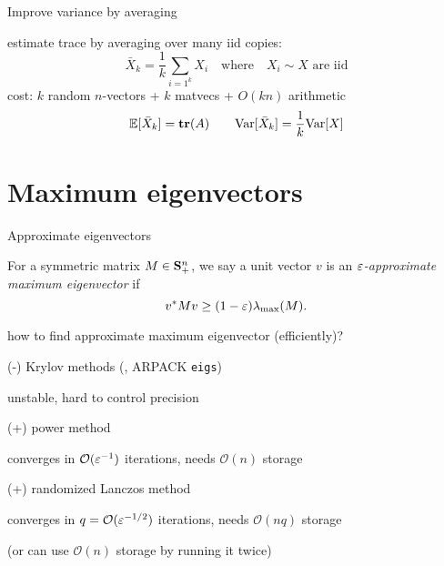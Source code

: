 \documentclass[presentation,xcolor={usenames,dvipsnames}]{beamer}
\begin{document}
\begin{frame}{Improve variance by averaging}

estimate trace by averaging over many iid copies:
\[
\bar X_k = \frac 1 k \sum_{i=1^k} X_i \quad \mbox{where} \quad X_i \sim X \mbox{ are iid}
\]
cost: $k$ random $n$-vectors + $k$ matvecs + $O(kn)$ arithmetic
\pause
\[
\mathbb E{}[\bar X_k] = \mathop{\bf tr}(A) \qquad \textup{Var}[\bar X_k] = \frac 1 k \textup{Var}[X]
\]

\end{frame}

\section{Maximum eigenvectors}

\begin{frame}{Approximate eigenvectors}

\begin{definition}
For a symmetric matrix $M \in \mathbf{S}_+^n$, we say
a unit vector $v$ is an \emph{$\varepsilon$-approximate maximum eigenvector} if
\[
v^* M v	\geq (1-\varepsilon) {\lambda_{\rm max}}(M).
\]
\end{definition}

\pause \vfill
how to find approximate maximum eigenvector (efficiently)?
\bit
\item (-) Krylov methods (\eg, ARPACK \texttt{eigs})
\bit \item unstable, hard to control precision \eit
\item (+) power method
\bit \item converges in $\mathcal O(\varepsilon^{-1})$ iterations, needs $\mathcal O(n)$ storage \eit
\item (+) randomized Lanczos method
\bit \item converges in $q = \mathcal O(\varepsilon^{-1/2})$ iterations, needs $\mathcal O(nq)$ storage
\item (or can use $\mathcal O(n)$ storage by running it twice) \eit
\eit

\end{frame}
\end{document}
